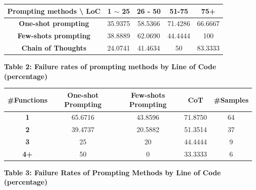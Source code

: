 \documentclass[onecolumn]{NobArticle}
\begin{document}
\vspace{-0.1cm}
\begin{table}[h]
\centering
\begin{tabular}{|c|c|c|c|c|}
\hline
\textbf{Prompting methods \textbackslash{} LoC} & \textbf{1 $\sim$ 25} & \textbf{26 - 50} & \textbf{51-75} & \textbf{75+} \\ \hline
\textbf{One-shot prompting}                    & 35.9375                                 & 58.5366                            & 71.4286                       & 66.6667                       \\ \hline
\textbf{Few-shots prompting}                   & 38.8889                            & 62.0690                            & 44.4444                       & 100                               \\ \hline
\textbf{Chain of Thoughts}                     & 24.0741                             & 41.4634                            & 50                                & 83.3333                       \\ \hline
\end{tabular}
    \vspace{0.2cm}
    \begin{center}
    \textbf{Table 2: Failure rates of prompting methods by Line of Code (percentage)}
    \end{center}
\end{table}

\begin{table}[h!]
\centering
\begin{tabular}{|c|c|c|c|c|}
\hline
\textbf{\#Functions} & \textbf{One-shot Prompting} & \textbf{Few-shots Prompting} & \textbf{CoT} & \textbf{\#Samples} \\
\hline
\textbf{1} & 65.6716 & 43.8596 & 71.8750 & 64 \\
\hline
\textbf{2} & 39.4737 & 20.5882 & 51.3514 & 37 \\
\hline
\textbf{3} & 25 & 20 & 44.4444 & 9 \\
\hline
\textbf{4+} & 50 & 0 & 33.3333 & 6 \\
\hline
\end{tabular}
    \begin{center}
    \textbf{Table 3: Failure Rates of Prompting Methods by Line of Code (percentage)}
    \end{center}
\label{table:prompting-methods}
\end{table}
\end{document}
